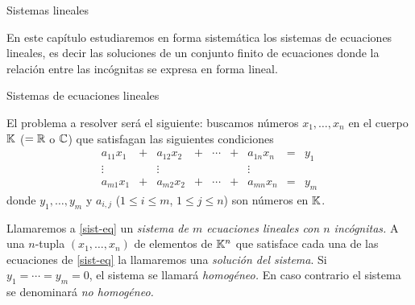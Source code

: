 
    \begin{chapter}{Sistemas lineales}\label{chap-sist-lin}
        
        En  este capítulo estudiaremos en forma sistemática los sistemas de ecuaciones lineales,  es decir las soluciones de un conjunto finito de ecuaciones  donde la relación entre las incógnitas se expresa en forma lineal.  
        
        
        \begin{section}{Sistemas de ecuaciones lineales}\label{seccion-sistemas-de-ecuaciones-lineales}
  
        
            El problema a resolver será el siguiente: buscamos números  $x_1,\ldots,x_n$ en el cuerpo $\mathbb K$ ($= \mathbb R$ o $\mathbb C$)  que satisfagan las siguientes condiciones
            \begin{equation}\label{sist-eq}
            \begin{matrix}
            a_{11}x_1& + &a_{12}x_2& + &\cdots& + &a_{1n}x_n &= &y_1\\
            \vdots&  &\vdots& &&  &\vdots \\
            a_{m1}x_1& + &a_{m2}x_2& + &\cdots& + &a_{mn}x_n &=&y_m
            \end{matrix}
            \end{equation}
            donde $y_1, \ldots,y_m$ y $a_{i,j}$ ($1 \le i \le m$, $1 \le j \le n$) son números en $\mathbb K$.
            
            Llamaremos a \eqref{sist-eq} un \textit{sistema de $m$ ecuaciones lineales con $n$ incógnitas.} A una  $n$-tupla $(x_1,\ldots,x_n)$ de elementos de $\mathbb K^n$ que satisface cada una de las ecuaciones de  \eqref{sist-eq} la llamaremos una \textit{solución del sistema}. Si $y_1 = \cdots = y_m=0$, el sistema se llamará \textit{homogéneo.} En caso contrario el sistema se denominará \textit{no homogéneo.}


\end{section}
\end{chapter}
